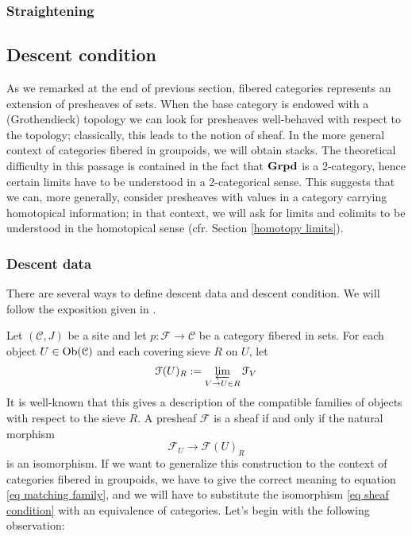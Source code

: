 \begin{refsection}
\subsubsection{Straightening}

\subsection{Descent condition}

As we remarked at the end of previous section, fibered categories represents an extension of presheaves of sets. When the base category is endowed with a (Grothendieck) topology we can look for presheaves well-behaved with respect to the topology; classically, this leads to the notion of sheaf. In the more general context of categories fibered in groupoids, we will obtain stacks. The theoretical difficulty in this passage is contained in the fact that $\mathbf{Grpd}$ is a 2-category, hence certain limits have to be understood in a 2-categorical sense. This suggests that we can, more generally, consider presheaves with values in a category carrying homotopical information; in that context, we will ask for limits and colimits to be understood in the homotopical sense (cfr. Section \ref{homotopy limits}).

\subsubsection*{Descent data}

There are several ways to define descent data and descent condition. We will follow the exposition given in \cite[Ch. 4]{vistoli}.

Let $(\mathcal C, J)$ be a site and let $p \colon \mathcal F \to \mathcal C$ be a category fibered in sets. For each object $U \in \operatorname{Ob}(\mathcal C)$ and each covering sieve $R$ on $U$, let
\begin{equation} \label{eq matching family}
\mathcal F(U)_R := \varprojlim_{V \to U \in R} \mathcal F_V
\end{equation}
It is well-known that this gives a description of the compatible families of objects with respect to the sieve $R$. A presheaf $\mathcal F$ is a sheaf if and only if the natural morphism
\begin{equation} \label{eq sheaf condition}
\mathcal F_U \to \mathcal F(U)_R
\end{equation}
is an isomorphism. If we want to generalize this construction to the context of categories fibered in groupoids, we have to give the correct meaning to equation \eqref{eq matching family}, and we will have to substitute the isomorphism \eqref{eq sheaf condition} with an equivalence of categories. Let's begin with the following observation:


\end{refsection}
